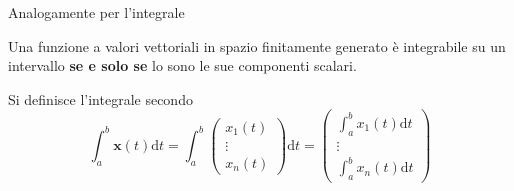 \documentclass[10pt]{article}
\theoremstyle{plain}
\begin{document}
Analogamente per l'integrale
\begin{prop}
Una funzione a valori vettoriali in spazio finitamente generato è integrabile su un intervallo \textbf{se e solo se} lo sono le sue componenti scalari.
\end{prop}
Si definisce l'integrale secondo
\[\int_{a}^{b}\mathbf{x}(t)\textrm{d}t = \int_{a}^{b}\begin{pmatrix}
x_1(t)\\
\vdots\\
x_n(t)
\end{pmatrix}\textrm{d}t = \begin{pmatrix}
\int_{a}^{b}x_1(t)\textrm{d}t\\
\vdots\\
\int_{a}^{b}x_n(t)\textrm{d}t
\end{pmatrix}\]
\end{document}
